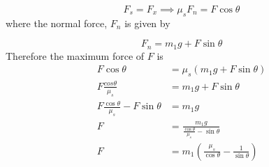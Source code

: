 \documentclass{article}
\begin{document}
\[
	F_s = F_x \implies \mu_s F_n = F\cos\theta
\]
where the normal force, $F_n$ is given by

\[
	F_n = m_1g + F\sin\theta
\]
Therefore the maximum force of $F$ is
\begin{align*}
	F\cos\theta &= \mu_s\left( m_1g + F\sin\theta \right) \\
	F\frac{cos\theta}{\mu_s} &= m_1g + F\sin\theta \\
	F\frac{\cos\theta}{\mu_s} - F\sin\theta &= m_1g \\
	F &= \frac{m_1g}{\frac{\cos\theta}{\mu_s} - \sin\theta} \\
	F &= m_1 \left(\frac{\mu_s}{\cos\theta} - \frac{1}{\sin\theta}\right)
\end{align*}
\end{document}

